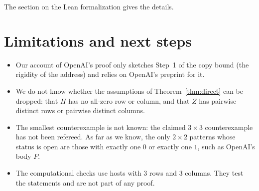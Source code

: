 \documentclass{article}
\theoremstyle{plain}
\theoremstyle{definition}
\begin{document}
The section on the Lean formalization gives the details.\par
\endgroup

\section*{Limitations and next steps}

\begin{itemize}
\item Our account of OpenAI's proof only sketches Step~1 of the copy bound (the rigidity of the
address) and relies on OpenAI's preprint for it.
\item We do not know whether the assumptions of Theorem~\ref{thm:direct} can be dropped: that
$H$ has no all-zero row or column, and that $Z$ has pairwise distinct rows or pairwise distinct
columns.
\item The smallest counterexample is not known: the claimed $3 \times 3$ counterexample has not
been refereed. As far as we know, the only $2 \times 2$ patterns whose status is open are those
with exactly one $0$ or exactly one $1$, such as OpenAI's body $P$.
\item The computational checks use hosts with $3$ rows and $3$ columns. They test the statements
and are not part of any proof.
\end{itemize}
\end{document}
